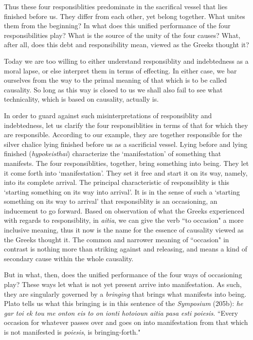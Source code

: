 \documentclass[12pt]{article}
\begin{document}
Thus these four responsiblities predominate in the sacrifical vessel that lies finished before us. They differ from each other, yet belong together. What unites them from the beginning? In what does this unified performance of the four responsibilities play? What is the source of the unity of the four causes? What, after all, does this debt and responsibility mean, viewed as the Greeks thought it? 

Today we are too willing to either understand responsiblity and indebtedness as a moral lapse, or else interpret them in terms of effecting. In either case, we bar ourselves from the way to the primal meaning of that which is to be called causality. So long as this way is closed to us we shall also fail to see what technicality, which is based on causality, actually is.

In order to guard against such misinterpretations of responsiblity and indebtedness, let us clarify the four responsiblities in terms of that for which they are responsible. According to our example, they are together responsible for the silver chalice lying finished before us as a sacrificial vessel. Lying before and lying finished (\textit{hypokeisthai}) characterize the `manifestation' of something that manifests. The four responsiblities, together, bring something into being. They let it come forth into `manifestation'. They set it free and start it on its way, namely, into its complete arrival. The principal characteristic of responsiblity is this `starting something on its way into arrival'. It is in the sense of such a `starting something on its way to arrival' that responsiblity is an occasioning, an inducement to go forward. Based on observation of what the Greeks experienced with regards to responsiblity, in \textit{aitia}, we can give the verb ``to occasion" a more inclusive meaning, thus it now is the name for the essence of causality viewed as the Greeks thought it. The common and narrower meaning of ``occasion" in contrast is nothing more than striking against and releasing, and means a kind of secondary cause within the whole causality.

But in what, then, does the unified performance of the four ways of occasioning play? These ways let what is not yet present arrive into manifestation. As such, they are singularly governed by a \textit{bringing} that brings what manifests into being. Plato tells us what this bringing is in this sentence of the \textit{Symposium} (205b): \textit{h{\-e} gar toi ek tou m{\-e} onton eis to on ionti hot{\-o}ioun aitia pasa esti poi{\-e}sis}. ``Every occasion for whatever passes over and goes on into manifestation from that which is not manifested is \textit{poi{\-e}sis}, is bringing-forth."
\end{document}
